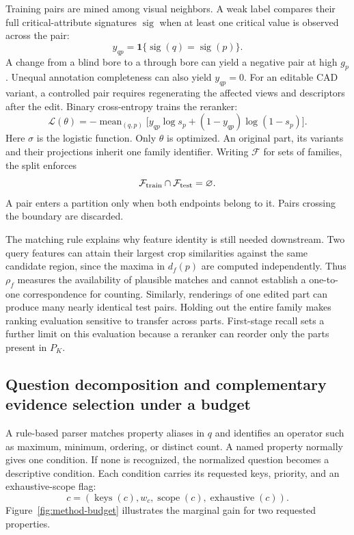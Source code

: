 Training pairs are mined among visual neighbors. A weak label compares their full critical-attribute signatures $\operatorname{sig}$ when at least one critical value is observed across the pair:
\begin{equation}
 y_{qp}=\mathbf1\{\operatorname{sig}(q)=\operatorname{sig}(p)\}.
\end{equation}
A change from a blind bore to a through bore can yield a negative pair at high $g_p$. Unequal annotation completeness can also yield $y_{qp}=0$. For an editable CAD variant, a controlled pair requires regenerating the affected views and descriptors after the edit. Binary cross-entropy trains the reranker:
\begin{equation}
 \mathcal L(\theta)=-\operatorname{mean}_{(q,p)}
 \big[y_{qp}\log s_p+(1-y_{qp})\log(1-s_p)\big].
\end{equation}
Here $\sigma$ is the logistic function. Only $\theta$ is optimized. An original part, its variants and their projections inherit one family identifier. Writing $\mathcal F$ for sets of families, the split enforces
\begin{equation}
 \mathcal F_{\rm train}\cap\mathcal F_{\rm test}=\varnothing .
\end{equation}
A pair enters a partition only when both endpoints belong to it. Pairs crossing the boundary are discarded.

The matching rule explains why feature identity is still needed downstream. Two query features can attain their largest crop similarities against the same candidate region, since the maxima in $d_f(p)$ are computed independently. Thus $\rho_f$ measures the availability of plausible matches and cannot establish a one-to-one correspondence for counting. Similarly, renderings of one edited part can produce many nearly identical test pairs. Holding out the entire family makes ranking evaluation sensitive to transfer across parts. First-stage recall sets a further limit on this evaluation because a reranker can reorder only the parts present in $P_K$.


\subsection{Question decomposition and complementary evidence selection under a budget}
\label{sec:method-selection}
A rule-based parser matches property aliases in $q$ and identifies an operator such as maximum, minimum, ordering, or distinct count. A named property normally gives one condition. If none is recognized, the normalized question becomes a descriptive condition. Each condition carries its requested keys, priority, and an exhaustive-scope flag:
\begin{equation}
 c=(\operatorname{keys}(c),w_c,\operatorname{scope}(c),
             \operatorname{exhaustive}(c)).
\end{equation}
Figure~\ref{fig:method-budget} illustrates the marginal gain for two requested properties.

